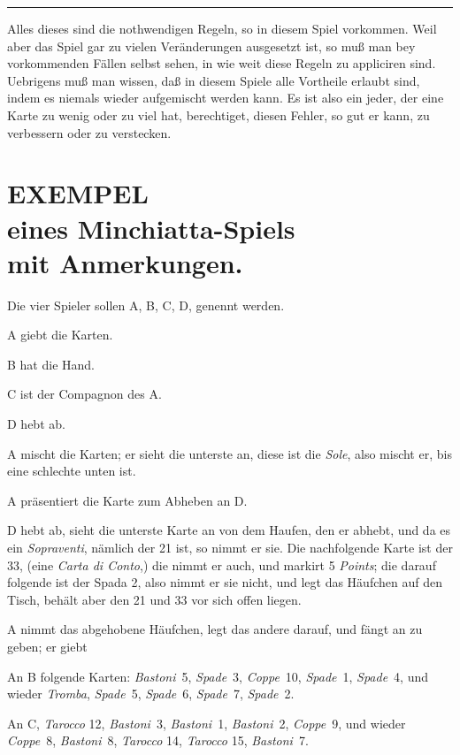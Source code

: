 \documentclass[11pt,a6paper,twoside]{article}
\newcommand{\separatingdash}{\kern 2pt {\hfill\rule[3pt]{9em}{1.3pt}\hfill\-} \kern 12pt}
\begin{document}
\separatingdash

Alles dieses sind die nothwendigen Regeln, so in diesem Spiel vorkommen. Weil aber das Spiel gar zu vielen Veränderungen ausgesetzt ist, so muß man bey vorkommenden Fällen selbst sehen, in wie weit diese Regeln zu appliciren sind. Uebrigens muß man wissen, daß in diesem Spiele alle Vortheile erlaubt sind, indem es niemals wieder aufgemischt werden kann. Es ist also ein jeder, der eine Karte zu wenig oder zu viel hat, berechtiget, diesen Fehler, so gut er kann, zu verbessern oder zu verstecken.


\section*{{\scshape\upshape EXEMPEL}\\eines Minchiatta-Spiels\\ mit Anmerkungen.}

Die vier Spieler sollen A, B, C, D, genennt werden.

A giebt die Karten.

B hat die Hand.

C ist der Compagnon des A.

D hebt ab.

A mischt die Karten; er sieht die unterste an, diese ist die \textit{Sole}, also mischt er, bis eine schlechte unten ist.

A präsentiert die Karte zum Abheben an D.

D hebt ab, sieht die unterste Karte an von dem Haufen, den er abhebt, und da es ein \textit{Sopraventi}, nämlich der 21 ist, so nimmt er sie. Die nachfolgende Karte ist der 33, (eine \textit{Carta di Conto},) die nimmt er auch, und markirt 5 \textit{Points}; die darauf folgende ist der Spada 2, also nimmt er sie nicht, und legt das Häufchen auf den Tisch, behält aber den 21 und 33 vor sich offen liegen.

A nimmt das abgehobene Häufchen, legt das andere darauf, und fängt an zu geben; er giebt

An B folgende Karten: \textit{Bastoni}~5, \textit{Spade}~3, \textit{Coppe}~10, \textit{Spade}~1, \textit{Spade}~4, und wieder \textit{Tromba}, \textit{Spade}~5, \textit{Spade}~6, \textit{Spade}~7, \textit{Spade}~2.

An C, \textit{Tarocco} 12, \textit{Bastoni}~3, \textit{Bastoni}~1, \textit{Bastoni}~2, \textit{Coppe}~9, und wieder \textit{Coppe}~8, \textit{Bastoni}~8, \textit{Tarocco} 14, \textit{Tarocco} 15, \textit{Bastoni}~7.
\end{document}
